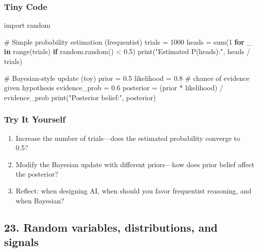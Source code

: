\documentclass[
  letterpaper,
  DIV=11,
  numbers=noendperiod]{scrreprt}
\newenvironment{Shaded}{\begin{snugshade}}{\end{snugshade}}
\newcommand{\BuiltInTok}[1]{\textcolor[rgb]{0.00,0.23,0.31}{#1}}
\newcommand{\CommentTok}[1]{\textcolor[rgb]{0.37,0.37,0.37}{#1}}
\newcommand{\ControlFlowTok}[1]{\textcolor[rgb]{0.00,0.23,0.31}{\textbf{#1}}}
\newcommand{\DecValTok}[1]{\textcolor[rgb]{0.68,0.00,0.00}{#1}}
\newcommand{\FloatTok}[1]{\textcolor[rgb]{0.68,0.00,0.00}{#1}}
\newcommand{\ImportTok}[1]{\textcolor[rgb]{0.00,0.46,0.62}{#1}}
\newcommand{\KeywordTok}[1]{\textcolor[rgb]{0.00,0.23,0.31}{\textbf{#1}}}
\newcommand{\NormalTok}[1]{\textcolor[rgb]{0.00,0.23,0.31}{#1}}
\newcommand{\OperatorTok}[1]{\textcolor[rgb]{0.37,0.37,0.37}{#1}}
\newcommand{\StringTok}[1]{\textcolor[rgb]{0.13,0.47,0.30}{#1}}
\providecommand{\tightlist}{%
  \setlength{\itemsep}{0pt}\setlength{\parskip}{0pt}}
\begin{document}
\subsubsection{Tiny Code}\label{tiny-code-21}

\begin{Shaded}
\begin{Highlighting}[]
\ImportTok{import}\NormalTok{ random}

\CommentTok{\# Simple probability estimation (frequentist)}
\NormalTok{trials }\OperatorTok{=} \DecValTok{1000}
\NormalTok{heads }\OperatorTok{=} \BuiltInTok{sum}\NormalTok{(}\DecValTok{1} \ControlFlowTok{for}\NormalTok{ \_ }\KeywordTok{in} \BuiltInTok{range}\NormalTok{(trials) }\ControlFlowTok{if}\NormalTok{ random.random() }\OperatorTok{\textless{}} \FloatTok{0.5}\NormalTok{)}
\BuiltInTok{print}\NormalTok{(}\StringTok{"Estimated P(heads):"}\NormalTok{, heads }\OperatorTok{/}\NormalTok{ trials)}

\CommentTok{\# Bayesian{-}style update (toy)}
\NormalTok{prior }\OperatorTok{=} \FloatTok{0.5}
\NormalTok{likelihood }\OperatorTok{=} \FloatTok{0.8}  \CommentTok{\# chance of evidence given hypothesis}
\NormalTok{evidence\_prob }\OperatorTok{=} \FloatTok{0.6}
\NormalTok{posterior }\OperatorTok{=}\NormalTok{ (prior }\OperatorTok{*}\NormalTok{ likelihood) }\OperatorTok{/}\NormalTok{ evidence\_prob}
\BuiltInTok{print}\NormalTok{(}\StringTok{"Posterior belief:"}\NormalTok{, posterior)}
\end{Highlighting}
\end{Shaded}

\subsubsection{Try It Yourself}\label{try-it-yourself-21}

\begin{enumerate}
\def\labelenumi{\arabic{enumi}.}
\tightlist
\item
  Increase the number of trials---does the estimated probability
  converge to 0.5?
\item
  Modify the Bayesian update with different priors---how does prior
  belief affect the posterior?
\item
  Reflect: when designing AI, when should you favor frequentist
  reasoning, and when Bayesian?
\end{enumerate}

\subsection{23. Random variables, distributions, and
signals}\label{random-variables-distributions-and-signals}
\end{document}

